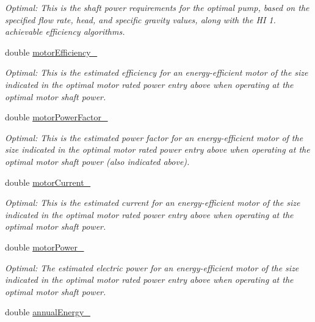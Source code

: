 \begin{DoxyCompactItemize}
\begin{DoxyCompactList}\small\item\em Optimal\+: This is the shaft power requirements for the optimal pump, based on the specified flow rate, head, and specific gravity values, along with the HI 1. achievable efficiency algorithms. \end{DoxyCompactList}\item 
double \hyperlink{struct_p_s_a_t_result_1_1result___a101600986354f5c1884169dc4486db9b}{motor\+Efficiency\+\_\+}
\begin{DoxyCompactList}\small\item\em Optimal\+: This is the estimated efficiency for an energy-\/efficient motor of the size indicated in the optimal motor rated power entry above when operating at the optimal motor shaft power. \end{DoxyCompactList}\item 
double \hyperlink{struct_p_s_a_t_result_1_1result___ad52a7dc3e6841efa64cd202fab047ac3}{motor\+Power\+Factor\+\_\+}
\begin{DoxyCompactList}\small\item\em Optimal\+: This is the estimated power factor for an energy-\/efficient motor of the size indicated in the optimal motor rated power entry above when operating at the optimal motor shaft power (also indicated above). \end{DoxyCompactList}\item 
double \hyperlink{struct_p_s_a_t_result_1_1result___acfdf51d60ae1007a94dcd46df3185c15}{motor\+Current\+\_\+}
\begin{DoxyCompactList}\small\item\em Optimal\+: This is the estimated current for an energy-\/efficient motor of the size indicated in the optimal motor rated power entry above when operating at the optimal motor shaft power. \end{DoxyCompactList}\item 
double \hyperlink{struct_p_s_a_t_result_1_1result___ac86aa1d4cf0178d5a74bf3de0c673e8c}{motor\+Power\+\_\+}
\begin{DoxyCompactList}\small\item\em Optimal\+: The estimated electric power for an energy-\/efficient motor of the size indicated in the optimal motor rated power entry above when operating at the optimal motor shaft power. \end{DoxyCompactList}\item 
double \hyperlink{struct_p_s_a_t_result_1_1result___acf5bcf6c5226d5e322239be520280ffc}{annual\+Energy\+\_\+}

\end{DoxyCompactItemize}
